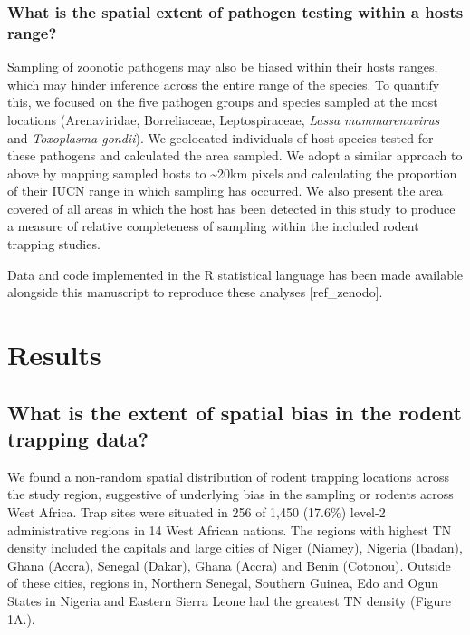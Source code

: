 \documentclass[
]{article}
\begin{document}
\hypertarget{what-is-the-spatial-extent-of-pathogen-testing-within-a-hosts-range}{%
\subsubsection{What is the spatial extent of pathogen testing within a
hosts
range?}\label{what-is-the-spatial-extent-of-pathogen-testing-within-a-hosts-range}}

Sampling of zoonotic pathogens may also be biased within their hosts
ranges, which may hinder inference across the entire range of the
species. To quantify this, we focused on the five pathogen groups and
species sampled at the most locations (Arenaviridae, Borreliaceae,
Leptospiraceae, \emph{Lassa mammarenavirus} and \emph{Toxoplasma
gondii}). We geolocated individuals of host species tested for these
pathogens and calculated the area sampled. We adopt a similar approach
to above by mapping sampled hosts to \textasciitilde20km pixels and
calculating the proportion of their IUCN range in which sampling has
occurred. We also present the area covered of all areas in which the
host has been detected in this study to produce a measure of relative
completeness of sampling within the included rodent trapping studies.

Data and code implemented in the R statistical language has been made
available alongside this manuscript to reproduce these analyses
{[}ref\_zenodo{]}.

\hypertarget{results}{%
\section{Results}\label{results}}

\hypertarget{what-is-the-extent-of-spatial-bias-in-the-rodent-trapping-data-1}{%
\subsection{What is the extent of spatial bias in the rodent trapping
data?}\label{what-is-the-extent-of-spatial-bias-in-the-rodent-trapping-data-1}}

We found a non-random spatial distribution of rodent trapping locations
across the study region, suggestive of underlying bias in the sampling
or rodents across West Africa. Trap sites were situated in 256 of 1,450
(17.6\%) level-2 administrative regions in 14 West African nations. The
regions with highest TN density included the capitals and large cities
of Niger (Niamey), Nigeria (Ibadan), Ghana (Accra), Senegal (Dakar),
Ghana (Accra) and Benin (Cotonou). Outside of these cities, regions in,
Northern Senegal, Southern Guinea, Edo and Ogun States in Nigeria and
Eastern Sierra Leone had the greatest TN density (Figure 1A.).
\end{document}
